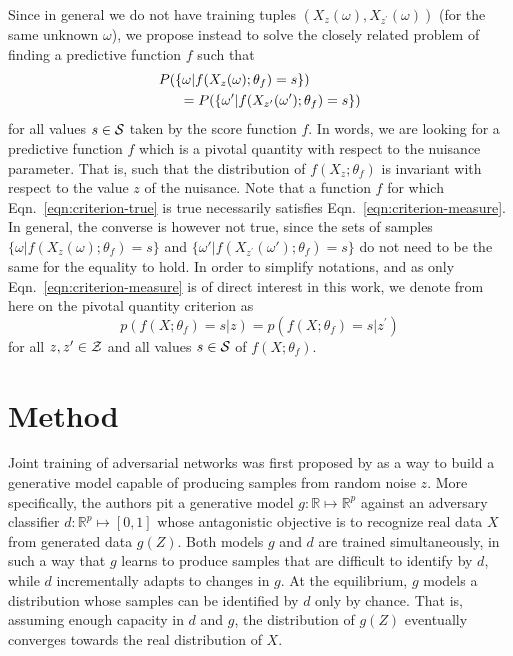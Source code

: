 \documentclass[twocolumn,superscriptaddress,aps]{revtex4-1}
\theoremstyle{plain}
\begin{document}
Since in general we do not have training tuples $(X_{z}(\omega),
X_{z^\prime}(\omega))$ (for the same unknown $\omega$), we propose instead to
solve the closely related problem of finding a predictive function $f$ such that
\begin{align}\label{eqn:criterion-measure}
    &P(\{ \omega | f(X_{z}(\omega) ; \theta_f) = s \} ) \nonumber \\
    &\indent = P( \{ \omega' | f(X_{z^\prime}(\omega') ; \theta_f) = s\})
\end{align}
for all values $s \in {\cal S}$ taken by the score function $f$. In words, we are looking for a predictive function $f$
which is a pivotal quantity \citep{degroot1986probability} with respect to the
nuisance parameter. That is, such that  the distribution of $f(X_z; \theta_f)$
is invariant with respect to the value $z$ of the nuisance. Note that a function
$f$ for which Eqn.~\ref{eqn:criterion-true} is true necessarily satisfies
Eqn.~\ref{eqn:criterion-measure}. In general, the converse is however not true,
since the sets of samples $\{ \omega | f(X_{z}(\omega); \theta_f) = s \}$ and $\{
\omega' | f(X_{z^\prime}(\omega'); \theta_f) = s \}$ do not need to be the same
for the equality to hold. In order to simplify notations, and as only
Eqn.~\ref{eqn:criterion-measure} is of direct interest in this work, we denote
from here on the pivotal quantity criterion as
\begin{equation}\label{eqn:criterion}
    p(f(X ; \theta_f) = s | z ) = p(f(X ; \theta_f) = s | z^\prime )
\end{equation}
for all $z,z^\prime \in  {\cal Z}$ and all values $s \in {\cal S}$ of $f(X ; \theta_f)$.



\section{Method}
\label{sec:method}

Joint training of adversarial networks was first proposed by \citep{goodfellow2014generative} as a
way to build a generative model capable of producing samples from random noise
$z$. More specifically, the authors pit a generative model $g:
\mathbb{R} \mapsto \mathbb{R}^p$ against an adversary classifier $d :
\mathbb{R}^p \mapsto [0, 1]$ whose antagonistic objective is to recognize
real data $X$ from generated data $g(Z)$. Both models $g$ and $d$ are trained
simultaneously, in such a way that $g$ learns to produce samples that are
difficult to identify by $d$, while $d$ incrementally adapts to changes in $g$.
At the equilibrium, $g$ models a distribution whose samples can be identified by
$d$ only by chance. That is, assuming enough capacity in $d$ and  $g$, the
distribution of $g(Z)$ eventually converges towards the real distribution
of $X$.
\end{document}
